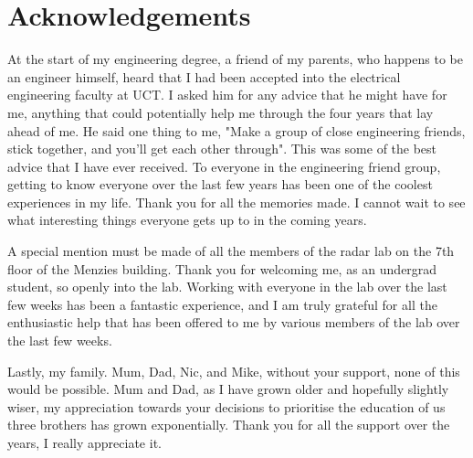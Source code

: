 {

\chapter*{Acknowledgements}
At the start of my engineering degree, a friend of my parents, who happens to be an engineer himself, heard that I had been accepted into the electrical engineering faculty at UCT. I asked him for any advice that he might have for me, anything that could potentially help me through the four years that lay ahead of me. He said one thing to me, "Make a group of close engineering friends, stick together, and you'll get each other through". This was some of the best advice that I have ever received. To everyone in the engineering friend group, getting to know everyone over the last few years has been one of the coolest experiences in my life. Thank you for all the memories made. I cannot wait to see what interesting things everyone gets up to in the coming years.

A special mention must be made of all the members of the radar lab on the 7th floor of the Menzies building. Thank you for welcoming me, as an undergrad student, so openly into the lab. Working with everyone in the lab over the last few weeks has been a fantastic experience, and I am truly grateful for all the enthusiastic help that has been offered to me by various members of the lab over the last few weeks.

Lastly, my family. Mum, Dad, Nic, and Mike, without your support, none of this would be possible. Mum and Dad, as I have grown older and hopefully slightly wiser, my appreciation towards your decisions to prioritise the education of us three brothers has grown exponentially. Thank you for all the support over the years, I really appreciate it.


}